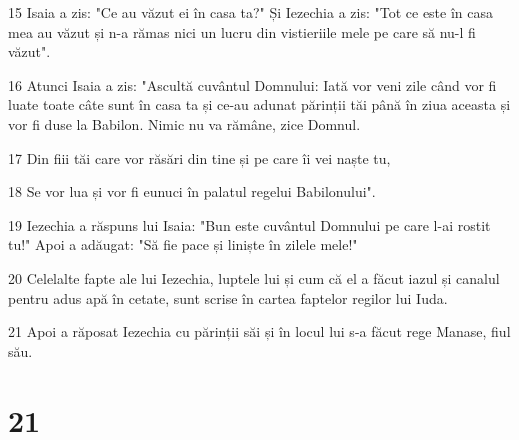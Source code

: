 \par 15 Isaia a zis: "Ce au văzut ei în casa ta?" Și Iezechia a zis: "Tot ce este în casa mea au văzut și n-a rămas nici un lucru din vistieriile mele pe care să nu-l fi văzut".
\par 16 Atunci Isaia a zis: "Ascultă cuvântul Domnului: Iată vor veni zile când vor fi luate toate câte sunt în casa ta și ce-au adunat părinții tăi până în ziua aceasta și vor fi duse la Babilon. Nimic nu va rămâne, zice Domnul.
\par 17 Din fiii tăi care vor răsări din tine și pe care îi vei naște tu,
\par 18 Se vor lua și vor fi eunuci în palatul regelui Babilonului".
\par 19 Iezechia a răspuns lui Isaia: "Bun este cuvântul Domnului pe care l-ai rostit tu!" Apoi a adăugat: "Să fie pace și liniște în zilele mele!"
\par 20 Celelalte fapte ale lui Iezechia, luptele lui și cum că el a făcut iazul și canalul pentru adus apă în cetate, sunt scrise în cartea faptelor regilor lui Iuda.
\par 21 Apoi a răposat Iezechia cu părinții săi și în locul lui s-a făcut rege Manase, fiul său.

\chapter{21}

